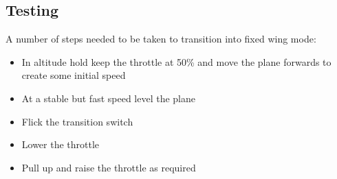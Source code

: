 \subsection{Testing}
A number of steps needed to be taken to transition into fixed wing mode: 
\begin{itemize}
\item In altitude hold keep the throttle at 50\% and move the plane forwards to create some initial speed
\item At a stable but fast speed level the plane
\item Flick the transition switch 
\item Lower the throttle
\item Pull up and raise the throttle as required
		
\end{itemize}
